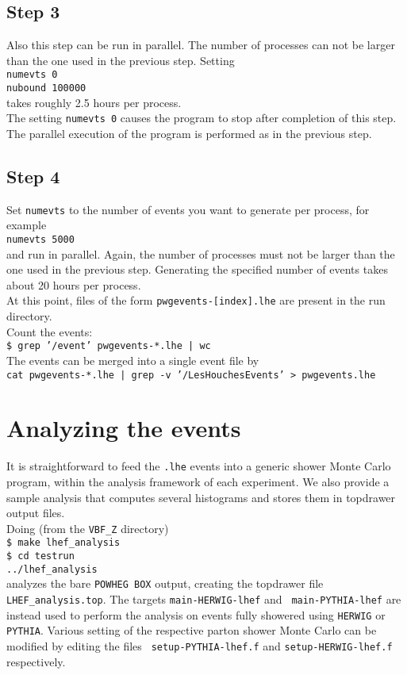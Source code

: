 \documentclass[a4paper,11pt]{article}
\begin{document}
\subsection*{Step 3}
%
Also this step can be run in parallel. The number of processes can 
not be larger than the one used in the previous step. Setting
\\[2ex]
{\tt numevts 0}
\\[2ex]
{\tt nubound 100000}
\\[2ex]
takes roughly 2.5 hours per process.
\\[2ex]
The setting {\tt numevts 0} causes the program to stop after
completion of this step.  The parallel execution of the program is
performed as in the previous step.

\subsection*{Step 4}
%
Set {\tt numevts} to the number of events you want to generate per
process, for example
\\[2ex]
{\tt numevts 5000}
\\[2ex]
and run in parallel. Again, the number of processes must not be larger than
the one used in the previous step. Generating the specified number of
events takes about 20 hours per process.
\\[2ex]
At this point, files of the form {\tt pwgevents-[index].lhe} are
present in the run directory.
\\[2ex]
Count the events:
\\[2ex]
{\tt \$ grep '/event' pwgevents-*.lhe | wc}
\\[2ex]
The events can be merged into a single event file by
\\[2ex]
{\tt cat pwgevents-*.lhe | grep -v '/LesHouchesEvents' >
  pwgevents.lhe}


\section*{Analyzing the events}
%
It is straightforward to feed the {\tt *.lhe} events into a generic
shower Monte Carlo program, within the analysis framework of each
experiment. We also provide a sample analysis that computes several
histograms and stores them in topdrawer output files.
\\[2ex]
Doing (from the {\tt VBF\_Z} directory)
\\[2ex]
{\tt \$ make lhef\_analysis}
\\[2ex]
{\tt \$ cd testrun}
\\[2ex]
{\tt ../lhef\_analysis}
\\[2ex]
analyzes the bare {\tt POWHEG BOX} output, creating the topdrawer file
{\tt LHEF\_analysis.top}. The targets {\tt main-HERWIG-lhef} and {\tt
  main-PYTHIA-lhef} are instead used to perform the analysis on events
fully showered using {\tt HERWIG} or {\tt PYTHIA}. Various setting of
the respective parton shower Monte Carlo can be modified by editing the files {\tt
  setup-PYTHIA-lhef.f} and {\tt setup-HERWIG-lhef.f} respectively.
\end{document}

